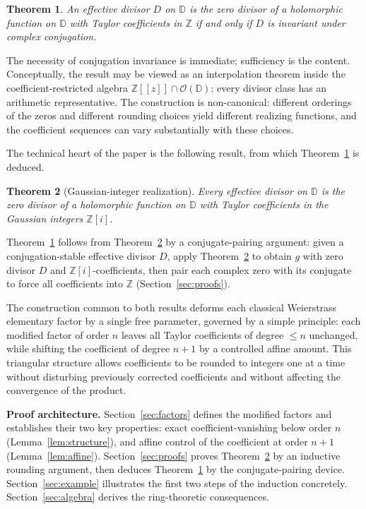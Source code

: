\documentclass{amsart}
\newtheorem{theorem}{Theorem}
\theoremstyle{definition}
\newcommand{\D}{\mathbb{D}}
\newcommand{\Z}{\mathbb{Z}}
\newcommand{\Zi}{\mathbb{Z}[i]}
\newcommand{\OD}{\mathcal{O}(\D)}
\begin{document}
\begin{theorem}
\label{thm:main}
An effective divisor $D$ on $\D$ is the zero divisor of a holomorphic
function on $\D$ with Taylor coefficients in $\Z$ if and only if $D$
is invariant under complex conjugation.
\end{theorem}

The necessity of conjugation invariance is immediate; sufficiency is
the content.  Conceptually, the result may be viewed as an
interpolation theorem inside the coefficient-restricted algebra
$\Z[[z]] \cap \OD$: every divisor class has an arithmetic
representative.  The construction is non-canonical: different orderings
of the zeros and different rounding choices yield different realizing
functions, and the coefficient sequences can vary substantially with
these choices.

The technical heart of the paper is the following result, from which
Theorem~\ref{thm:main} is deduced.

\begin{theorem}[Gaussian-integer realization]
\label{prop:Zi}
Every effective divisor on $\D$ is the zero divisor of a holomorphic
function on $\D$ with Taylor coefficients in the Gaussian integers
$\Zi$.
\end{theorem}

Theorem~\ref{thm:main} follows from Theorem~\ref{prop:Zi} by a
conjugate-pairing argument: given a conjugation-stable effective
divisor $D$, apply Theorem~\ref{prop:Zi} to obtain $g$ with zero
divisor $D$ and $\Zi$-coefficients, then pair each complex zero with
its conjugate to force all coefficients into $\Z$
(Section~\ref{sec:proofs}).

The construction common to both results deforms each classical
Weierstrass elementary factor by a single free parameter, governed by
a simple principle: each modified factor of order $n$ leaves all
Taylor coefficients of degree $\leq n$ unchanged, while shifting the
coefficient of degree $n+1$ by a controlled affine amount.  This
triangular structure allows coefficients to be rounded to integers
one at a time without disturbing previously corrected coefficients and
without affecting the convergence of the product.

\medskip\noindent\textbf{Proof architecture.}
Section~\ref{sec:factors} defines the modified factors and establishes
their two key properties: exact coefficient-vanishing below order $n$
(Lemma~\ref{lem:structure}), and affine control of the coefficient at
order $n+1$ (Lemma~\ref{lem:affine}).  Section~\ref{sec:proofs} proves
Theorem~\ref{prop:Zi} by an inductive rounding argument, then deduces
Theorem~\ref{thm:main} by the conjugate-pairing device.
Section~\ref{sec:example} illustrates the first two steps of the
induction concretely.  Section~\ref{sec:algebra} derives the
ring-theoretic consequences.
\end{document}
